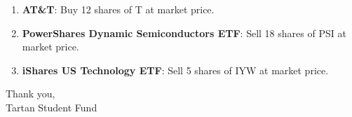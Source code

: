 \documentclass[11pt,pressrelease]{newlfm} %
\begin{document}
\begin{newlfm}



\vspace{-.5 in}
\begin{singlespace} %

\begin{enumerate}
\item \textbf{AT\&T}:  Buy 12 shares of T at market price.


\item  \textbf{PowerShares Dynamic Semiconductors ETF}:  Sell 18 shares of PSI at market price.

\item \textbf{iShares US Technology ETF}: Sell 5 shares of IYW at market price. 


\end{enumerate}


Thank you, \\
Tartan Student Fund

\end{singlespace} %


\end{newlfm}
\end{document}
